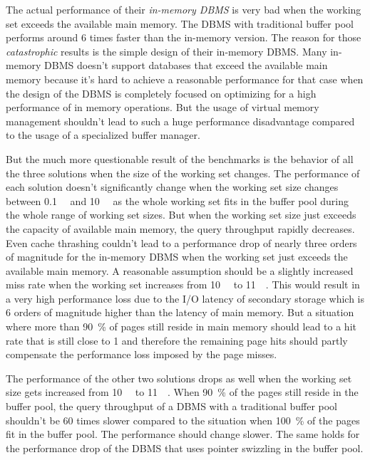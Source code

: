     The actual performance of their \emph{in-memory DBMS} is very bad when the working set exceeds the available main memory. The DBMS with traditional buffer pool performs around 6 times faster than the in-memory version. The reason for those \emph{catastrophic} results is the simple design of their in-memory DBMS. Many in-memory DBMS doesn't support databases that exceed the available main memory because it's hard to achieve a reasonable performance for that case when the design of the DBMS is completely focused on optimizing for a high performance of in memory operations. But the usage of virtual memory management shouldn't lead to such a huge performance disadvantage compared to the usage of a specialized buffer manager.

    But the much more questionable result of the benchmarks is the behavior of all the three solutions when the size of the working set changes. The performance of each solution doesn't significantly change when the working set size changes between \SI{0.1}{\giga\byte} and \SI{10}{\giga\byte} as the whole working set fits in the buffer pool during the whole range of working set sizes. But when the working set size just exceeds the capacity of available main memory, the query throughput rapidly decreases. Even cache thrashing couldn't lead to a performance drop of nearly three orders of magnitude for the in-memory DBMS when the working set just exceeds the available main memory. A reasonable assumption should be a slightly increased miss rate when the working set increases from \SI{10}{\giga\byte} to \SI{11}{\giga\byte}. This would result in a very high performance loss due to the I/O latency of secondary storage which is 6 orders of magnitude higher than the latency of main memory. But a situation where more than \SI{90}{\percent} of pages still reside in main memory should lead to a hit rate that is still close to 1 and therefore the remaining page hits should partly compensate the performance loss imposed by the page misses.

    The performance of the other two solutions drops as well when the working set size gets increased from \SI{10}{\giga\byte} to \SI{11}{\giga\byte}. When \SI{90}{\percent} of the pages still reside in the buffer pool, the query throughput of a DBMS with a traditional buffer pool shouldn't be 60 times slower compared to the situation when \SI{100}{\percent} of the pages fit in the buffer pool. The performance should change slower. The same holds for the performance drop of the DBMS that uses pointer swizzling in the buffer pool.


